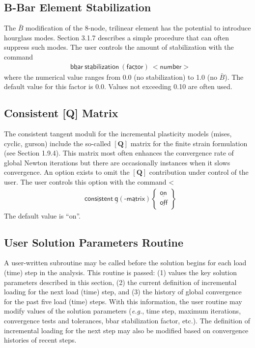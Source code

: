 \documentclass[11pt]{report}
\numberwithin{equation}{section}
\newcommand{\nin} {\noindent}
\newcommand{\bmf } {\boldsymbol }  %
\newcommand{\ul} {\underline}
\newcommand{\hv} {\mathsf}   %
\newcommand{\eg}{\emph{e.g.},\xspace}
\begin{document}
\subsection{B-Bar Element Stabilization}
\nin The $\bar B$ modification of the 8-node, trilinear element has the potential to introduce 
hourglass modes. Section 3.1.7 describes a simple procedure that can often suppress such modes. 
The user controls the amount of stabilization with the command
\begin{align*}
&\hv{\ul{bbar}\  \ul{stabil}ization\  (\ul{factor})\  <number>  }
\end{align*}
\nin where the numerical value ranges from 0.0 (no stabilization) to 1.0 (no $\bar B$). 
The default value for this factor is 0.0. Values not exceeding 0.10 are often used.

\subsection{ Consistent [Q] Matrix}
\nin The consistent tangent moduli for the incremental plasticity models (mises, cyclic, gurson) 
include the so-called $[\bmf{Q}]$ matrix for the finite strain formulation (see Section 1.9.4). 
This matrix most often enhances the convergence rate of global Newton iterations 
but there are occasionally instances when it slows convergence. 
\nin An option exists to omit the $[\bmf{Q}]$ contribution under control of the user. 
The user controls this option with the command <
\begin{align*}
&\hv{\ul{consistent}\  \ul{q}(\ul{\mbox{-}matrix})  }
\begin{Bmatrix}
\hv{\ul{on} }\\ \hv{\ul{off}}
\end{Bmatrix}
\end{align*}
\nin The default value is ``on''.

\subsection{User Solution Parameters Routine}
\nin A user-written subroutine may be called before the solution begins for each
load (time) step in the analysis. This routine is passed: (1) values the key solution
parameters described in this section, (2) the current definition of incremental
loading for the next
load (time) step, and (3) the history of global convergence for the
past five load (time) steps. With this information, the user routine may modify values
of the solution parameters (\eg time step, maximum iterations, convergence tests
and tolerances, bbar stabilization factor, etc.). The definition of
incremental loading for the next step may also be modified based on convergence
histories of recent steps.
\end{document}
